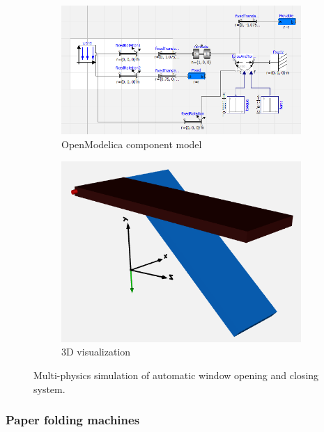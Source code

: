 \documentclass{PDS}
\begin{document}
\begin{figure}[htbp]
    \begin{subfigure}[b]{0.575\textwidth}
        \includegraphics[width=\textwidth]{./figures/glasshouse_mechatronic_1.png}
        \caption{OpenModelica component model}
        \label{fig:glasshouse-sim-1}
    \end{subfigure}
    \hfill
    \begin{subfigure}[b]{0.41\textwidth}
        \includegraphics[width=\textwidth]{./figures/glasshouse_mechatronic_2.png}
        \caption{3D visualization}
        \label{fig:glasshouse-sim-2}
    \end{subfigure}
    \caption{Multi-physics simulation of automatic window opening and closing system.}
    \label{fig:glasshouse-sim}
\end{figure}

\subsubsection{Paper folding machines}
\label{sec:master-system-lego}
\end{document}
